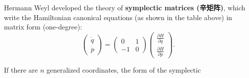 Hermann Weyl developed the theory of \textbf{symplectic matrices
(辛矩阵)}, which write the Hamiltonian canonical equations (as shown in
the table above) in matrix form (one-degree): \[\begin{pmatrix}
    \dot{q} \\
    \dot{p}
\end{pmatrix} = \begin{pmatrix}
    0 & 1 \\
    -1 & 0
\end{pmatrix} \begin{pmatrix}
    \displaystyle \frac{\partial H}{\partial q} \\[1.5ex]
    \displaystyle \frac{\partial H}{\partial p}
\end{pmatrix}.\]

If there are \(n\) generalized coordinates, the form of the symplectic
